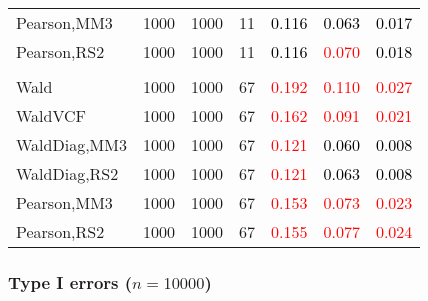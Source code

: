 \documentclass[
]{article}
\begin{document}
\begin{table}[H]
{\begin{tabular}[t]{lrrrrrr}
\hspace{1em}Pearson,MM3 & 1000 & 1000 & 11 & \textcolor{black}{0.116} & \textcolor{black}{0.063} & \textcolor{black}{0.017}\\
\hspace{1em}Pearson,RS2 & 1000 & 1000 & 11 & \textcolor{black}{0.116} & \textcolor{red}{0.070} & \textcolor{black}{0.018}\\
\addlinespace[0.3em]
\multicolumn{7}{l}{\textbf{3F 15V}}\\
\hspace{1em}Wald & 1000 & 1000 & 67 & \textcolor{red}{0.192} & \textcolor{red}{0.110} & \textcolor{red}{0.027}\\
\hspace{1em}WaldVCF & 1000 & 1000 & 67 & \textcolor{red}{0.162} & \textcolor{red}{0.091} & \textcolor{red}{0.021}\\
\hspace{1em}WaldDiag,MM3 & 1000 & 1000 & 67 & \textcolor{red}{0.121} & \textcolor{black}{0.060} & \textcolor{black}{0.008}\\
\hspace{1em}WaldDiag,RS2 & 1000 & 1000 & 67 & \textcolor{red}{0.121} & \textcolor{black}{0.063} & \textcolor{black}{0.008}\\
\hspace{1em}Pearson,MM3 & 1000 & 1000 & 67 & \textcolor{red}{0.153} & \textcolor{red}{0.073} & \textcolor{red}{0.023}\\
\hspace{1em}Pearson,RS2 & 1000 & 1000 & 67 & \textcolor{red}{0.155} & \textcolor{red}{0.077} & \textcolor{red}{0.024}\\
\bottomrule
\end{tabular}}
\endgroup{}
\end{table}

\hypertarget{type-i-errors-n10000-3}{%
\subsubsection{\texorpdfstring{Type I errors
(\(n=10000\))}{Type I errors (n=10000)}}\label{type-i-errors-n10000-3}}
\end{document}
